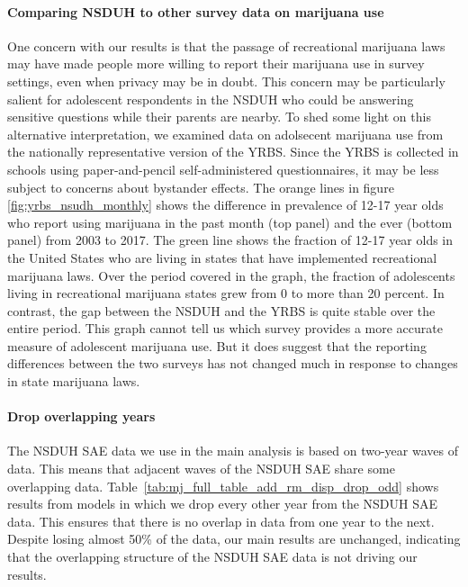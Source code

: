 \documentclass[12pt]{article}%
\begin{document}
\paragraph{Comparing NSDUH to other survey data on marijuana use}
One concern with our results is that the passage of recreational marijuana laws may have made people more willing to report their marijuana use in survey settings, even when privacy may be in doubt. This concern may be particularly salient for adolescent respondents in the NSDUH who could be answering sensitive questions while their parents are nearby. To shed some light on this alternative interpretation, we examined data on adolsecent marijuana use from the nationally representative version of the YRBS. Since the YRBS is collected in schools using paper-and-pencil self-administered questionnaires, it may be less subject to concerns about bystander effects. The orange lines in figure \ref{fig:yrbs_nsudh_monthly} shows the difference in prevalence of 12-17 year olds who report using marijuana in the past month (top panel) and the ever (bottom panel) from 2003 to 2017. The green line shows the fraction of 12-17 year olds in the United States who are living in states that have implemented recreational marijuana laws. Over the period covered in the graph, the fraction of adolescents living in recreational marijuana states grew from 0 to more than 20 percent. In contrast, the gap between the NSDUH and the YRBS is quite stable over the entire period. This graph cannot tell us which survey provides a more accurate measure of adolescent marijuana use. But it does suggest that the reporting differences between the two surveys has not changed much in response to changes in state marijuana laws. 


\paragraph{Drop overlapping years}
The NSDUH SAE data we use in the main analysis is based on two-year waves of data. This means that adjacent waves of the NSDUH SAE share some overlapping data. Table~\ref{tab:mj_full_table_add_rm_disp_drop_odd} shows results from models in which we drop every other year from the NSDUH SAE data. This ensures that there is no overlap in data from one year to the next. Despite losing almost 50\% of the data, our main results are unchanged, indicating that the overlapping structure of the NSDUH SAE data is not driving our results. 

\end{document}
